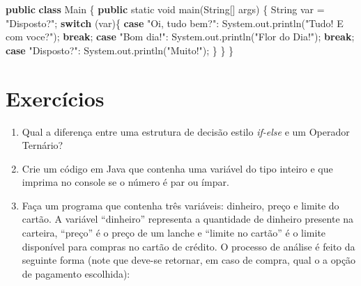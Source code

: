 \documentclass[
]{book}
\newenvironment{Shaded}{\begin{snugshade}}{\end{snugshade}}
\newcommand{\BuiltInTok}[1]{#1}
\newcommand{\DataTypeTok}[1]{\textcolor[rgb]{0.13,0.29,0.53}{#1}}
\newcommand{\FunctionTok}[1]{\textcolor[rgb]{0.00,0.00,0.00}{#1}}
\newcommand{\KeywordTok}[1]{\textcolor[rgb]{0.13,0.29,0.53}{\textbf{#1}}}
\newcommand{\NormalTok}[1]{#1}
\newcommand{\StringTok}[1]{\textcolor[rgb]{0.31,0.60,0.02}{#1}}
\providecommand{\tightlist}{%
  \setlength{\itemsep}{0pt}\setlength{\parskip}{0pt}}
\begin{document}
\begin{Shaded}
\begin{Highlighting}[]
\KeywordTok{public} \KeywordTok{class}\NormalTok{ Main \{}
    \KeywordTok{public} \DataTypeTok{static} \DataTypeTok{void} \FunctionTok{main}\NormalTok{(}\BuiltInTok{String}\NormalTok{[] args) \{}
        \BuiltInTok{String}\NormalTok{ var = }\StringTok{"Disposto?"}\NormalTok{;}
        \KeywordTok{switch}\NormalTok{ (var)\{}
            \KeywordTok{case} \StringTok{"Oi, tudo bem?"}\NormalTok{:}
                \BuiltInTok{System}\NormalTok{.}\FunctionTok{out}\NormalTok{.}\FunctionTok{println}\NormalTok{(}\StringTok{"Tudo! E com voce?"}\NormalTok{);}
                \KeywordTok{break}\NormalTok{;}
            \KeywordTok{case} \StringTok{"Bom dia!"}\NormalTok{:}
                \BuiltInTok{System}\NormalTok{.}\FunctionTok{out}\NormalTok{.}\FunctionTok{println}\NormalTok{(}\StringTok{"Flor do Dia!"}\NormalTok{);}
                \KeywordTok{break}\NormalTok{;}
            \KeywordTok{case} \StringTok{"Disposto?"}\NormalTok{:}
                \BuiltInTok{System}\NormalTok{.}\FunctionTok{out}\NormalTok{.}\FunctionTok{println}\NormalTok{(}\StringTok{"Muito!"}\NormalTok{);}
\NormalTok{        \}}
\NormalTok{    \}}
\NormalTok{\}}
\end{Highlighting}
\end{Shaded}

\hypertarget{exercuxedcios}{%
\section*{Exercícios}\label{exercuxedcios}}

\begin{enumerate}
\def\labelenumi{\arabic{enumi}.}
\tightlist
\item
  Qual a diferença entre uma estrutura de decisão estilo \emph{if-else} e um Operador Ternário?
\item
  Crie um código em Java que contenha uma variável do tipo inteiro e que imprima no console se o número é par ou ímpar.
\item
  Faça um programa que contenha três variáveis: dinheiro, preço e limite do cartão. A variável ``dinheiro'' representa a quantidade de dinheiro presente na carteira, ``preço'' é o preço de um lanche e ``limite no cartão'' é o limite disponível para compras no cartão de crédito. O processo de análise é feito da seguinte forma (note que deve-se retornar, em caso de compra, qual o a opção de pagamento escolhida):
\end{enumerate}
\end{document}
